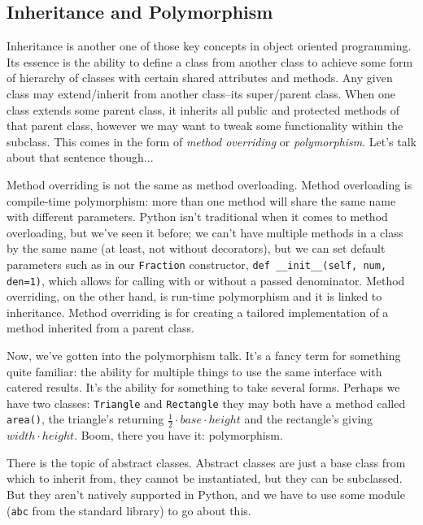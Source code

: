 \documentclass[12pt, twoside, reqno]{book}
\begin{document}
\subsection{Inheritance and Polymorphism}

Inheritance is another one of those key concepts in object oriented programming. Its essence is the ability to define a class from another class to achieve some form of hierarchy of classes with certain shared attributes and methods. Any given class may extend/inherit from another class--its super/parent class. When one class extends some parent class, it inherits all public and protected methods of that parent class, however we may want to tweak some functionality within the subclass. This comes in the form of \textit{method overriding} or \textit{polymorphism}. Let's talk about that sentence though...

Method overriding is not the same as method overloading. Method overloading is compile-time polymorphism: more than one method will share the same name with different parameters. Python isn't traditional when it comes to method overloading, but we've seen it before; we can't have multiple methods in a class by the same name (at least, not without decorators), but we can set default parameters such as in our \texttt{Fraction} constructor, \texttt{def \_\_init\_\_(self, num, den=1)}, which allows for calling with or without a passed denominator. Method overriding, on the other hand, is run-time polymorphism and it is linked to inheritance. Method overriding is for creating a tailored implementation of a method inherited from a parent class.

Now, we've gotten into the polymorphism talk. It's a fancy term for something quite familiar: the ability for multiple things to use the same interface with catered results. It's the ability for something to take several forms. Perhaps we have two classes: \texttt{Triangle} and \texttt{Rectangle} they may both have a method called \texttt{area()}, the triangle's returning $\frac{1}{2} \cdot base \cdot height$ and the rectangle's giving $width \cdot height$. Boom, there you have it: polymorphism.

There is the topic of abstract classes. Abstract classes are just a base class from which to inherit from, they cannot be instantiated, but they can be subclassed. But they aren't natively supported in Python, and we have to use some module (\texttt{abc} from the standard library) to go about this.
\end{document}
